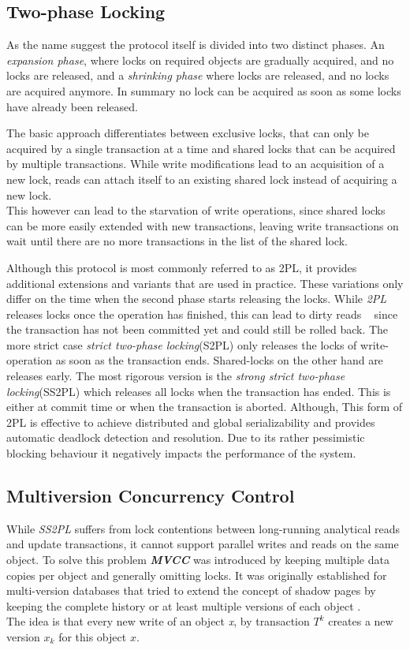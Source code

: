 \subsection{Two-phase Locking}

As the name suggest the protocol itself is divided into two distinct phases. An \emph{expansion phase}, where locks on required objects are gradually acquired, 
and no locks are released, and a \emph{shrinking phase} where locks are released, and no locks are acquired anymore.
In summary no lock can be acquired as soon as some locks have already been released.

The basic approach differentiates between exclusive locks, that can only be acquired by a single transaction at a time and shared locks that 
can be acquired by multiple transactions. While write modifications lead to an acquisition of a new lock, reads can attach itself to an existing shared lock 
instead of acquiring a new lock. \\
This however can lead to the starvation of write operations, since shared locks can be more easily extended with new transactions, leaving write transactions on wait until 
there are no more transactions in the list of the shared lock. 

Although this protocol is most commonly referred to as 2PL, it provides additional extensions and variants that are used in practice. 
These variations only differ on the time when the second phase starts releasing the locks. 
While \emph{2PL} releases locks once the operation has finished, this can lead to dirty 
reads ~\cite{} since the transaction has not been committed yet and could still be rolled back.
The more strict case \emph{strict two-phase locking}(S2PL) only releases the locks of write-operation as soon as the transaction ends.
Shared-locks on the other hand are releases early.
The most rigorous version is the \emph{strong strict two-phase locking}(SS2PL) which releases all locks when the transaction has ended.
This is either at commit time or when the transaction is aborted.
Although, This form of 2PL is effective to achieve distributed and global serializability and provides automatic deadlock detection and resolution.
Due to its rather pessimistic blocking behaviour it negatively impacts the performance of the system.



\subsection{Multiversion Concurrency Control}
While \emph{SS2PL} suffers from lock contentions between long-running analytical reads and update transactions, it cannot support parallel writes and reads on the same object. 
To solve this problem \emph{\textbf{MVCC}} \cite{bernstein:1981} was introduced by keeping multiple data copies per object and generally omitting locks.
It was originally established for multi-version databases that tried to extend the concept of shadow pages by keeping the complete history or at least multiple versions 
of each object \cite{bernstein:1982, bernstein:1983}.\\
The idea is that every new write of an object \emph{x}, by transaction $T^k$ creates a new version $x_k$ for this object $x$.

